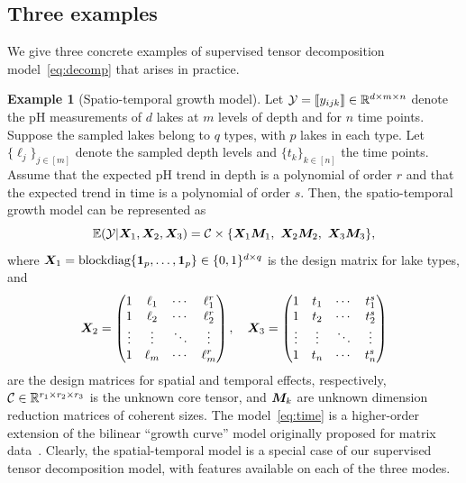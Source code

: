\documentclass[12pt]{article}
\theoremstyle{plain}
\theoremstyle{definition}
\newtheorem{example}{Example}
\begin{document}
\subsection{Three examples}
We give three concrete examples of supervised tensor decomposition model~\eqref{eq:decomp} that arises in practice. 
\begin{example}[Spatio-temporal growth model]
Let $\mathcal{Y}=\llbracket y_{ijk} \rrbracket\in\mathbb{R}^{d \times m\times n}$ denote the pH measurements of $d$ lakes at $m$ levels of depth and for $n$ time points. Suppose the sampled lakes belong to $q$ types, with $p$ lakes in each type. Let $\{\ell_j\}_{j\in[m]}$ denote the sampled depth levels and $\{t_k\}_{k\in[n]}$ the time points. Assume that the expected pH trend in depth is a polynomial of order $r$ and that the expected trend in time is a polynomial of order $s$. Then, the spatio-temporal growth model can be represented as
\begin{equation}\label{eq:time}
\mathbb{E}(\tY|\mX_1,\mX_2,\mX_3)=\tC\times\{\mX_1\mM_1,\ \mX_2\mM_2,\ \mX_3\mM_3\},
\end{equation}
where $\bm X_1=\text{blockdiag}\{\mathbf{1}_p,\ldots,\mathbf{1}_p\}\in \{0,1\}^{d\times q}$ is the design matrix for lake types, and
\[
\bm X_2=
\begin{pmatrix}
1 & \ell_1&\cdots &\ell^{r}_1\\
1 & \ell_2&\cdots &\ell^{r}_2\\
\vdots &\vdots&\ddots&\vdots\\
1&\ell_{m}&\cdots&\ell^{r}_{m}
\end{pmatrix},\quad
\bm X_3=
\begin{pmatrix}
1 & t_1&\cdots &t^{s}_1\\
1 & t_2&\cdots &t^{s}_2\\
\vdots &\vdots&\ddots&\vdots\\
1&t_{n}&\cdots&t^{s}_{n}
\end{pmatrix}
\]
are the design matrices for spatial and temporal effects, respectively, $\mathcal{C}\in\mathbb{R}^{r_1\times r_2\times r_3}$ is the unknown core tensor, and $\bm M_k$ are unknown dimension reduction matrices of coherent sizes. The model~\eqref{eq:time} is a higher-order extension of the bilinear ``growth curve'' model originally proposed for matrix data~\citep{gabriel1998generalised,potthoff1964generalized,srivastava2008models}. Clearly, the spatial-temporal model is a special case of our supervised tensor decomposition model, with features available on each of the three modes.
\end{example}
\end{document}
